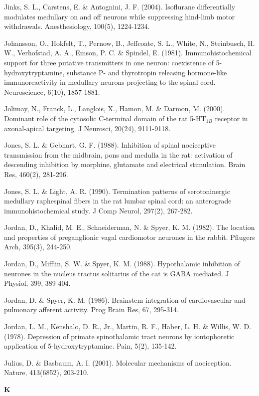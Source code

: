 \documentclass[a4paper,12pt,twoside]{report}
\begin{document}
\begin{singlespacing}
\begin{footnotesize}
Jinks, S. L., Carstens, E. \& Antognini, J. F. (2004). Isoflurane differentially modulates medullary on and off neurons while suppressing hind-limb motor withdrawals. Anesthesiology, 100(5), 1224-1234.

Johansson, O., Hokfelt, T., Pernow, B., Jeffcoate, S. L., White, N., Steinbusch, H. W., Verhofstad, A. A., Emson, P. C. \& Spindel, E. (1981). Immunohistochemical support for three putative transmitters in one neuron: coexistence of 5-hydroxytryptamine, substance P- and thyrotropin releasing hormone-like immunoreactivity in medullary neurons projecting to the spinal cord. Neuroscience, 6(10), 1857-1881.

Jolimay, N., Franck, L., Langlois, X., Hamon, M. \& Darmon, M. (2000). Dominant role of the cytosolic C-terminal domain of the rat 5-HT$_{1B}$ receptor in axonal-apical targeting. J Neurosci, 20(24), 9111-9118.

Jones, S. L. \& Gebhart, G. F. (1988). Inhibition of spinal nociceptive transmission from the midbrain, pons and medulla in the rat: activation of descending inhibition by morphine, glutamate and electrical stimulation. Brain Res, 460(2), 281-296.

Jones, S. L. \& Light, A. R. (1990). Termination patterns of serotoninergic medullary raphespinal fibers in the rat lumbar spinal cord: an anterograde immunohistochemical study. J Comp Neurol, 297(2), 267-282.

Jordan, D., Khalid, M. E., Schneiderman, N. \& Spyer, K. M. (1982). The location and properties of preganglionic vagal cardiomotor neurones in the rabbit. Pflugers Arch, 395(3), 244-250.

Jordan, D., Mifflin, S. W. \& Spyer, K. M. (1988). Hypothalamic inhibition of neurones in the nucleus tractus solitarius of the cat is GABA mediated. J Physiol, 399, 389-404.

Jordan, D. \& Spyer, K. M. (1986). Brainstem integration of cardiovascular and pulmonary afferent activity. Prog Brain Res, 67, 295-314.

Jordan, L. M., Kenshalo, D. R., Jr., Martin, R. F., Haber, L. H. \& Willis, W. D. (1978). Depression of primate spinothalamic tract neurons by iontophoretic application of 5-hydroxytryptamine. Pain, 5(2), 135-142.

Julius, D. \& Basbaum, A. I. (2001). Molecular mechanisms of nociception. Nature, 413(6852), 203-210.

\medskip
\begin{Large}\textbf{K}\end{Large}


\end{footnotesize}
\end{singlespacing}
\end{document}
